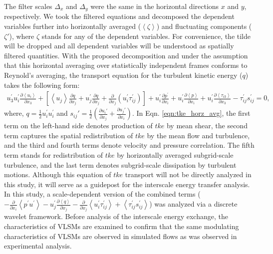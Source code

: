 The filter scales $\Delta_x$ and $\Delta_y$ were the same in the horizontal directions $x$ and $y$, respectively. We took the filtered equations and decomposed the dependent variables further into horizontally  averaged ($\left< \zeta \right>$) and fluctuating components ($\zeta\prime$), where $\zeta$ stands for any of the dependent variables. For convenience, the tilde will be dropped and all dependent variables will be understood as spatially filtered quantities. With the proposed decomposition and under the assumption that this horizontal averaging over statistically independent frames conforms to Reynold's averaging, the transport equation for the turbulent kinetic energy ($q$) takes the following form:
\begin{align}
u_3^\prime u_i^\prime \frac{\partial \left< u_i \right>}{\partial x_3}+[\left< u_j\right>\frac{\partial q}{\partial x_j}+u_j^\prime\frac{\partial q}{\partial x_j}+\frac{\partial }{\partial x_j}(u_i^\prime \tau_{ij}^\prime)]+u_i^\prime\frac{\partial p^\prime}{\partial x_i}+ u_i^\prime \frac{\partial \left < p \right >}{\partial x_i}+u_i^\prime\frac{\partial \left < \tau_{i3} \right >}{\partial x_3}-\tau_{ij}^\prime s_{ij}^\prime =0,
\label{eqn:tke_horz_avg}
\end{align}
\noindent where, $q=\frac{1}{2}u^{\prime}_i u^{\prime}_i$ and $s_{ij}'=\frac{1}{2}(\frac{\partial u_{i}'}{\partial x_j}+\frac{\partial u_{j}'}{\partial x_i})$.
In Eqn. \ref{eqn:tke_horz_avg}, the first term on the left-hand side denotes production of $tke$ by mean shear, the second term captures the spatial redistribution of $tke$ by the mean flow and turbulence, and the third and fourth terms denote velocity and pressure correlation.  The fifth term stands for redistribution of $tke$ by horizontally averaged subgrid-scale turbulence, and the last term denotes subgrid-scale dissipation by turbulent motions. Although this equation of $tke$ transport will not be directly analyzed in this study, it will serve as a guidepost for the interscale energy transfer analysis. In this study, a scale-dependent version of the combined terms ($-\frac{\partial }{\partial x_i}\left< p^\prime u^\prime\right>-u_j^\prime\frac{\partial \left< q\right>}{\partial x_j}-\frac{\partial}{\partial x_j}\left< u_i^\prime\tau_{ij}^\prime \right>+\left< \tau_{ij}^\prime s_{ij}^\prime\right>$) was analyzed via a discrete wavelet framework. Before analysis of the interscale energy exchange, the characteristics of VLSMs are examined to confirm that the same modulating characteristics of VLSMs are observed in simulated flows as was observed in experimental analysis. 

